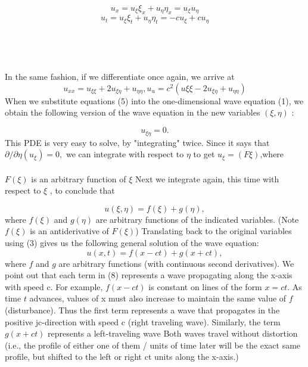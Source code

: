 \documentclass[../main.tex]{subfiles}
\begin{document}
$$u_x = u_\xi \xi_x + u_\eta \eta_x = u_\xi u_\eta$$
\begin{equation} \label{eqa4}
u_t =u_\xi \xi_t +u_\eta \eta_t =-cu_\xi+cu_\eta
\end{equation}
\\
\\
\\
\\
In the same fashion, if we differentiate once again, we arrive at
\begin{equation}\label{eqa5}
u_{xx} =u_{\xi \xi}+2u_{\xi \eta}+u_{\eta \eta} , u_u = c^2(u{\xi \xi}-2u_{\xi \eta}+ u_{\eta \eta})  
\end{equation} 
When we substitute equations (5) into the one-dimensional wave equation (1), we
obtain the following version of the wave equation in the new variables $(\xi ,\eta)$ : 

\begin{equation}\label{eqa6}
u_{\xi \eta}=0.
\end{equation}
This PDE is very easy to solve, by "integrating" twice. Since it says that $\partial /\partial \eta(u_\xi)=0,$ we can integrate with respect to $\eta$ to get $u_\xi=(F\xi)$,where
\\
\\
$F(\xi)$  is an arbitrary function of $\xi$ Next we integrate again, this time with respect
to $\xi$ , to conclude that

\begin{equation} \label{eqa7}
u(\xi,\eta)=f(\xi)+g(\eta),
\end{equation}
where $f(\xi)$ and $g(\eta)$ are arbitrary functions of the indicated variables. (Note  $f(\xi)$ is an antiderivative of $F(\xi)$) Translating back to the original variables
using (3) gives us the following general solution of the wave equation:
\begin{equation}\label{eqa8}
u(x,t)=f(x-ct)+g(x + ct),
\end{equation}
where $f$ and $g$ are arbitrary functions (with continuous second derivatives). We
point out that each term in (8) represents a wave propagating along the x-axis with
speed c. For example,  $f(x-ct)$  is constant on lines of the form $x = ct$. As time $t$
advances, values of x must also increase to maintain the same value of $f$ (disturbance). Thus the first term represents a wave that propagates in the positive
jc-direction with speed c (right traveling wave). Similarly, the term
$g(x + ct)$ represents a left-traveling wave Both waves travel without distortion
(i.e., the profile of either one of them / units of time later will be the exact same
profile, but shifted to the left or right ct units along the x-axis.)
\end{document}

